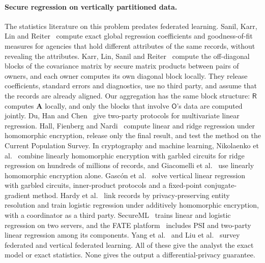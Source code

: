 \documentclass[11pt]{article}
\theoremstyle{definition}
\theoremstyle{plain}
\newcommand{\bA}{\mathbf{A}}
\newcommand{\Party}[1]{\textsf{#1}}
\newcommand{\Rp}{\Party{R}}
\newcommand{\Op}{\Party{O}}
\begin{document}
\paragraph{Secure regression on vertically partitioned data.} The statistics literature on this problem predates federated learning. Sanil, Karr, Lin and Reiter~\cite{sanil2004privacy} compute exact global regression coefficients and goodness-of-fit measures for agencies that hold different attributes of the same records, without revealing the attributes. Karr, Lin, Sanil and Reiter~\cite{karr2009privacy} compute the off-diagonal blocks of the covariance matrix by secure matrix products between pairs of owners, and each owner computes its own diagonal block locally. They release coefficients, standard errors and diagnostics, use no third party, and assume that the records are already aligned. Our aggregation has the same block structure: $\Rp$ computes $\bA$ locally, and only the blocks that involve $\Op$'s data are computed jointly. Du, Han and Chen~\cite{du2004privacy} give two-party protocols for multivariate linear regression. Hall, Fienberg and Nardi~\cite{hall2011secure} compute linear and ridge regression under homomorphic encryption, release only the final result, and test the method on the Current Population Survey. In cryptography and machine learning, Nikolaenko et al.~\cite{nikolaenko2013privacy} combine linearly homomorphic encryption with garbled circuits for ridge regression on hundreds of millions of records, and Giacomelli et al.~\cite{giacomelli2018privacy} use linearly homomorphic encryption alone. Gasc\'on et al.~\cite{gascon2017privacy} solve vertical linear regression with garbled circuits, inner-product protocols and a fixed-point conjugate-gradient method. Hardy et al.~\cite{hardy2017private} link records by privacy-preserving entity resolution and train logistic regression under additively homomorphic encryption, with a coordinator as a third party. SecureML~\cite{mohassel2017secureml} trains linear and logistic regression on two servers, and the FATE platform~\cite{liu2021fate} includes PSI and two-party linear regression among its components. Yang et al.~\cite{yang2019federated} and Liu et al.~\cite{liu2024vertical} survey federated and vertical federated learning. All of these give the analyst the exact model or exact statistics. None gives the output a differential-privacy guarantee.
\end{document}
